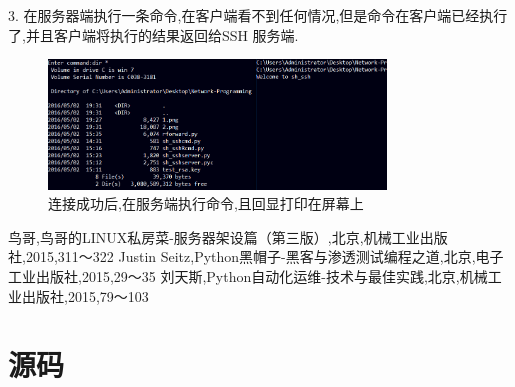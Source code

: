 \documentclass[UTF8,nofonts,a4paper]{ctexart}
\begin{document}
3. 在服务器端执行一条命令,在客户端看不到任何情况,但是命令在客户端已经执行了,并且客户端将执行的结果返回给SSH 服务端.\\

\begin{figure}[htbp]
\begin{center}
  \includegraphics[width=0.8\textwidth]{3.png}
  \caption{连接成功后,在服务端执行命令,且回显打印在屏幕上}
\end{center}
\end{figure}


\newpage
\begin{thebibliography}{99}

鸟哥,鸟哥的LINUX私房菜-服务器架设篇（第三版）,北京,机械工业出版社,2015,311～322
Justin Seitz,Python黑帽子-黑客与渗透测试编程之道,北京,电子工业出版社,2015,29～35
刘天斯,Python自动化运维-技术与最佳实践,北京,机械工业出版社,2015,79～103

\end{thebibliography}

\newpage
\appendix
\section{源码}
\end{document}
